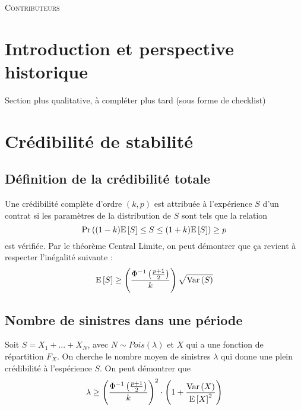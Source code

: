 \documentclass[10pt, french]{article}
\begin{document}
\begin{center}
	\textsc{\Large Contributeurs}\\[0.5cm] 
\end{center}


\raggedcolumns
\newpage
\begin{multicols*}{3} %
\section{Introduction et perspective historique}
Section plus qualitative, à compléter plus tard (sous forme de checklist)



\columnbreak
\section{Crédibilité de stabilité}
\subsection*{Définition de la crédibilité totale}
\begin{definition}
Une crédibilité complète d'ordre $(k,p)$ est attribuée à l'expérience $S$ d'un contrat si les paramètres de la distribution de $S$ sont tels que la relation
\[\Pr \left( (1-k)\mathrm{E} \left[ S \right] \leq S \leq (1+k) \mathrm{E} \left[ S \right] \right) \geq p \]
est vérifiée. Par le théorème Central Limite, on peut démontrer que ça revient à respecter l'inégalité suivante : 
\begin{equation}
\mathrm{E} \left[ S \right] \geq \left( \frac{\Phi^{-1}\left(\frac{p+1}{2} \right)}{k} \right) \sqrt{\mathrm{Var} \left( S \right)}
\end{equation}
\end{definition}

\subsection*{Nombre de sinistres dans une période}
Soit $S = X_1 + ... + X_N$, avec $N \sim Pois(\lambda)$ et $X$ qui a une fonction de répartition $F_X$. On cherche le nombre moyen de sinistres $\lambda$ qui donne une plein crédibilité à l'espérience $S$. On peut démontrer que
\begin{equation}
\lambda \geq \left( \frac{\Phi^{-1}\left(\frac{p+1}{2} \right)}{k} \right)^2 \cdot \left(1 + \frac{\mathrm{Var} \left( X \right)}{\mathrm{E} \left[ X \right]^2} \right)
\end{equation}

\end{multicols*}
\end{document}
